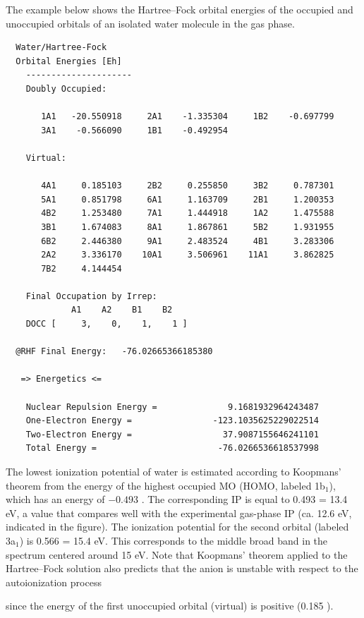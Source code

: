 \documentclass[../Main/chem371-notes.tex]{subfiles}
\begin{document}
The example below shows the Hartree--Fock orbital energies of the occupied and unoccupied orbitals of an isolated water molecule in the gas phase.
\begin{small}
\begin{verbatim}
  Water/Hartree-Fock
  Orbital Energies [Eh]
    ---------------------
    Doubly Occupied:                                                      

       1A1   -20.550918     2A1    -1.335304     1B2    -0.697799  
       3A1    -0.566090     1B1    -0.492954  

    Virtual:                                                              

       4A1     0.185103     2B2     0.255850     3B2     0.787301  
       5A1     0.851798     6A1     1.163709     2B1     1.200353  
       4B2     1.253480     7A1     1.444918     1A2     1.475588  
       3B1     1.674083     8A1     1.867861     5B2     1.931955  
       6B2     2.446380     9A1     2.483524     4B1     3.283306  
       2A2     3.336170    10A1     3.506961    11A1     3.862825  
       7B2     4.144454  

    Final Occupation by Irrep:
             A1    A2    B1    B2 
    DOCC [     3,    0,    1,    1 ]

  @RHF Final Energy:   -76.02665366185380

   => Energetics <=

    Nuclear Repulsion Energy =              9.1681932964243487
    One-Electron Energy =                -123.1035625229022514
    Two-Electron Energy =                  37.9087155646241101
    Total Energy =                        -76.0266536618537998
\end{verbatim}
\end{small}

The lowest ionization potential of water is estimated according to Koopmans' theorem from the energy of the highest occupied MO (HOMO, labeled 1b$_1$), which has an energy of $-0.493$ \Eh.
The corresponding IP is equal to 0.493 \Eh = 13.4 eV, a value that compares well with the experimental gas-phase IP (ca. 12.6 eV, indicated in the figure).
The ionization potential for the second orbital (labeled 3a$_1$) is 0.566 \Eh = 15.4 eV.
This corresponds to the  middle broad band in the spectrum centered around 15 eV.
Note that Koopmans' theorem applied to the Hartree--Fock solution also predicts that the anion  is unstable with respect to the autoionization process
\begin{center}
\end{center}
since the energy of the first unoccupied orbital (virtual) is positive (0.185 \Eh).
\end{document}
